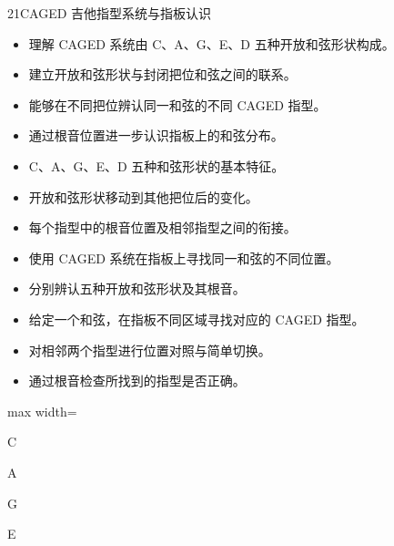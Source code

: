 \begin{lessoncard}{21}{CAGED 吉他指型系统与指板认识}
\begin{itemize}
\item 理解 CAGED 系统由 C、A、G、E、D 五种开放和弦形状构成。
\item 建立开放和弦形状与封闭把位和弦之间的联系。
\item 能够在不同把位辨认同一和弦的不同 CAGED 指型。
\item 通过根音位置进一步认识指板上的和弦分布。
\end{itemize}
\begin{itemize}
\item C、A、G、E、D 五种和弦形状的基本特征。
\item 开放和弦形状移动到其他把位后的变化。
\item 每个指型中的根音位置及相邻指型之间的衔接。
\item 使用 CAGED 系统在指板上寻找同一和弦的不同位置。
\end{itemize}
\begin{itemize}
\item 分别辨认五种开放和弦形状及其根音。
\item 给定一个和弦，在指板不同区域寻找对应的 CAGED 指型。
\item 对相邻两个指型进行位置对照与简单切换。
\item 通过根音检查所找到的指型是否正确。
\end{itemize}
\begin{fignote}
\begin{center}
\begin{adjustbox}{max width=\textwidth}
\begin{chordbox}{C}
\end{chordbox}\hspace{7mm}%
\begin{chordbox}{A}
\end{chordbox}\hspace{7mm}%
\begin{chordbox}{G}
\end{chordbox}\hspace{7mm}%
\begin{chordbox}{E}

\end{chordbox}
\end{adjustbox}
\end{center}
\end{fignote}
\end{lessoncard}
